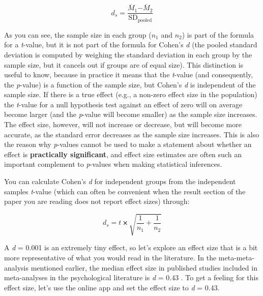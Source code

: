 \documentclass[
  oneside]{krantz}
\begin{document}
\[d_s = \frac{{\overline{M}}_{1}{-\overline{M}}_{2}}{\text{SD}_{\text{pooled}}}\]

As you can see, the sample size in each group (\(n_1\) and \(n_2\)) is part of the formula for a \emph{t}-value, but it is not part of the formula for Cohen's \emph{d} (the pooled standard deviation is computed by weighing the standard deviation in each group by the sample size, but it cancels out if groups are of equal size). This distinction is useful to know, because in practice it means that the \emph{t}-value (and consequently, the \emph{p}-value) is a function of the sample size, but Cohen's \emph{d} is independent of the sample size. If there is a true effect (e.g., a non-zero effect size in the population) the \emph{t}-value for a null hypothesis test against an effect of zero will on average become larger (and the \emph{p}-value will become smaller) as the sample size increases. The effect size, however, will not increase or decrease, but will become more accurate, as the standard error decreases as the sample size increases. This is also the reason why \emph{p}-values cannot be used to make a statement about whether an effect is \textbf{practically significant}, and effect size estimates are often such an important complement to \emph{p}-values when making statistical inferences.

You can calculate Cohen's \emph{d} for independent groups from the independent samples \emph{t}-value (which can often be convenient when the result section of the paper you are reading does not report effect sizes) through:

\[d_s = t ⨯ \sqrt{\frac{1}{n_{1}} + \frac{1}{n_{2}}}\]

A \emph{d} = 0.001 is an extremely tiny effect, so let's explore an effect size that is a bit more representative of what you would read in the literature. In the meta-meta-analysis mentioned earlier, the median effect size in published studies included in meta-analyses in the psychological literature is \emph{d} = 0.43 \citep{richard_one_2003}. To get a feeling for this effect size, let's use the online app and set the effect size to \emph{d} = 0.43.
\end{document}
